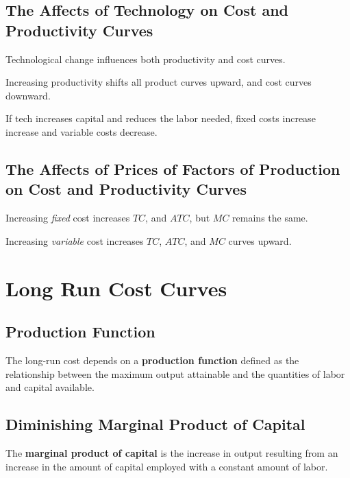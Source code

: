                 \subsection{The Affects of Technology on Cost and Productivity Curves} %
                \label{sub:the_affects_of_technology_on_cost_and_productivity_curves}
                    Technological change influences both productivity and cost curves.

                    Increasing productivity shifts all product curves upward, and cost curves downward.

                    If tech increases capital and reduces the labor needed, fixed costs increase increase and variable costs decrease.
                \subsection{The Affects of Prices of Factors of Production on Cost and Productivity Curves} %
                \label{sub:the_affects_of_prices_of_factors_of_production_on_cost_and_productivity_curves}
                    Increasing \textit{fixed} cost increases $TC$, and $ATC$, but $MC$ remains the same.

                    Increasing \textit{variable} cost increases $TC$, $ATC$, and $MC$ curves upward.
            \section{Long Run Cost Curves} %
            \label{sec:long_run_cost_curves}
                \subsection{Production Function} %
                \label{sub:production_function}
                    The long-run cost depends on a \textbf{production function} defined as the relationship between the maximum output attainable and the quantities of labor and capital available.
                \subsection{Diminishing Marginal Product of Capital} %
                \label{sub:diminishing_marginal_product_capital}
                    The \textbf{marginal product of capital} is the increase in output resulting from an increase in the amount of capital employed with a constant amount of labor.
